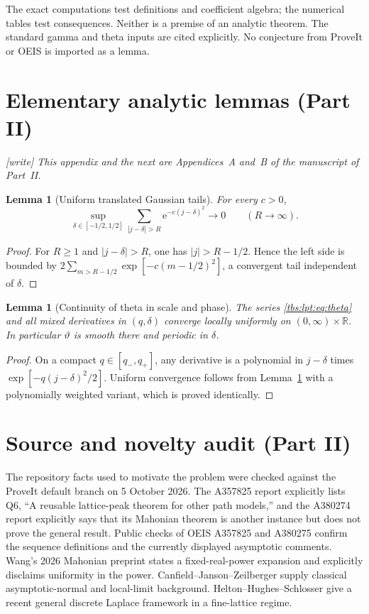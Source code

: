 \documentclass[11pt,a4paper]{article}
\numberwithin{equation}{section}
\newtheorem{lemma}[theorem]{Lemma}
\theoremstyle{definition}
\newcommand{\R}{\mathbb R}
\newcommand{\ee}{\mathrm e}
\begin{document}
The exact computations test definitions and coefficient algebra; the
numerical tables test consequences. Neither is a premise of an analytic
theorem. The standard gamma and theta inputs are cited explicitly.
No conjecture from ProveIt or OEIS is imported as a lemma.

\section{Elementary analytic lemmas (Part II)}\label{tbs:lpt:app:lemmas}

\emph{[write] This appendix and the next are Appendices~A and~B of the
manuscript of Part~II.}

\begin{lemma}[Uniform translated Gaussian tails]\label{tbs:lpt:lem:tails}
For every $c>0$,
\[
 \sup_{\delta\in[-1/2,1/2]}
 \sum_{|j-\delta|>R}\ee^{-c(j-\delta)^2}\longrightarrow0
 \qquad(R\to\infty).
\]
\end{lemma}
\begin{proof}
For $R\ge1$ and $|j-\delta|>R$, one has $|j|>R-1/2$. Hence the left side is
bounded by $2\sum_{m>R-1/2}\exp[-c(m-1/2)^2]$, a convergent tail
independent of $\delta$.
\end{proof}

\begin{lemma}[Continuity of theta in scale and phase]\label{tbs:lpt:lem:theta-cont}
The series \eqref{tbs:lpt:eq:theta} and all mixed derivatives in
$(q,\delta)$ converge locally uniformly on $(0,\infty)\times\R$. In
particular $\vartheta$ is smooth there and periodic in $\delta$.
\end{lemma}
\begin{proof}
On a compact $q\in[q_-,q_+]$, any derivative is a polynomial in
$j-\delta$ times $\exp[-q(j-\delta)^2/2]$. Uniform convergence follows
from Lemma~\ref{tbs:lpt:lem:tails} with a polynomially weighted variant,
which is proved identically.
\end{proof}

\section{Source and novelty audit (Part II)}\label{tbs:lpt:app:audit}

The repository facts used to motivate the problem were checked against
the ProveIt default branch on 5 October 2026. The A357825 report
explicitly lists Q6, ``A reusable lattice-peak theorem for other path
models,'' and the A380274 report explicitly says that its Mahonian
theorem is another instance but does not prove the general result. Public
checks of OEIS A357825 and A380275 confirm the sequence definitions and
the currently displayed asymptotic comments. Wang's 2026 Mahonian
preprint states a fixed-real-power expansion and explicitly disclaims
uniformity in the power. Canfield--Janson--Zeilberger supply classical
asymptotic-normal and local-limit background. Helton--Hughes--Schlosser
give a recent general discrete Laplace framework in a fine-lattice
regime.
\end{document}
